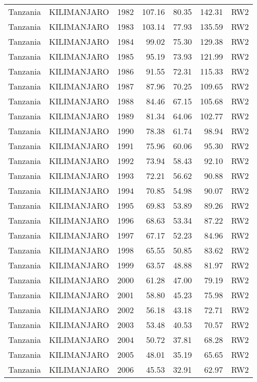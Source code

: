 \begin{longtable}{lllrrrl}
  Tanzania & KILIMANJARO & 1982 & 107.16 & 80.35 & 142.31 & RW2 \\ 
  Tanzania & KILIMANJARO & 1983 & 103.14 & 77.93 & 135.59 & RW2 \\ 
  Tanzania & KILIMANJARO & 1984 & 99.02 & 75.30 & 129.38 & RW2 \\ 
  Tanzania & KILIMANJARO & 1985 & 95.19 & 73.93 & 121.99 & RW2 \\ 
  Tanzania & KILIMANJARO & 1986 & 91.55 & 72.31 & 115.33 & RW2 \\ 
  Tanzania & KILIMANJARO & 1987 & 87.96 & 70.25 & 109.65 & RW2 \\ 
  Tanzania & KILIMANJARO & 1988 & 84.46 & 67.15 & 105.68 & RW2 \\ 
  Tanzania & KILIMANJARO & 1989 & 81.34 & 64.06 & 102.77 & RW2 \\ 
  Tanzania & KILIMANJARO & 1990 & 78.38 & 61.74 & 98.94 & RW2 \\ 
  Tanzania & KILIMANJARO & 1991 & 75.96 & 60.06 & 95.30 & RW2 \\ 
  Tanzania & KILIMANJARO & 1992 & 73.94 & 58.43 & 92.10 & RW2 \\ 
  Tanzania & KILIMANJARO & 1993 & 72.21 & 56.62 & 90.88 & RW2 \\ 
  Tanzania & KILIMANJARO & 1994 & 70.85 & 54.98 & 90.07 & RW2 \\ 
  Tanzania & KILIMANJARO & 1995 & 69.83 & 53.89 & 89.26 & RW2 \\ 
  Tanzania & KILIMANJARO & 1996 & 68.63 & 53.34 & 87.22 & RW2 \\ 
  Tanzania & KILIMANJARO & 1997 & 67.17 & 52.23 & 84.96 & RW2 \\ 
  Tanzania & KILIMANJARO & 1998 & 65.55 & 50.85 & 83.62 & RW2 \\ 
  Tanzania & KILIMANJARO & 1999 & 63.57 & 48.88 & 81.97 & RW2 \\ 
  Tanzania & KILIMANJARO & 2000 & 61.28 & 47.00 & 79.19 & RW2 \\ 
  Tanzania & KILIMANJARO & 2001 & 58.80 & 45.23 & 75.98 & RW2 \\ 
  Tanzania & KILIMANJARO & 2002 & 56.18 & 43.18 & 72.71 & RW2 \\ 
  Tanzania & KILIMANJARO & 2003 & 53.48 & 40.53 & 70.57 & RW2 \\ 
  Tanzania & KILIMANJARO & 2004 & 50.72 & 37.81 & 68.28 & RW2 \\ 
  Tanzania & KILIMANJARO & 2005 & 48.01 & 35.19 & 65.65 & RW2 \\ 
  Tanzania & KILIMANJARO & 2006 & 45.53 & 32.91 & 62.97 & RW2 \\ 

\end{longtable}
